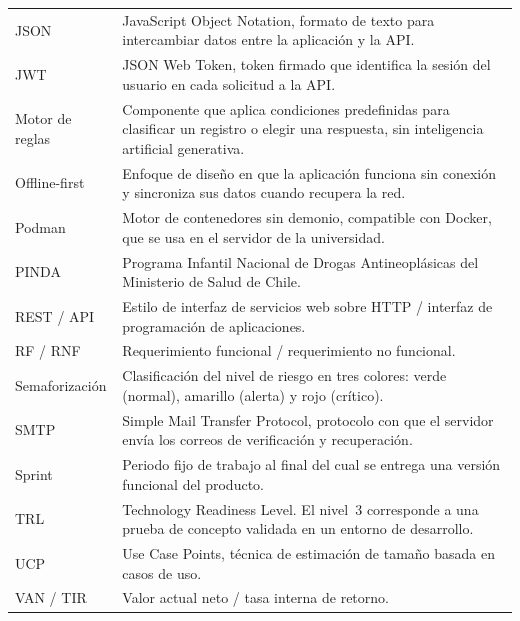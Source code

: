 \begin{xltabular}{\textwidth}{P{0.50}P{1.50}}
    JSON & JavaScript Object Notation, formato de texto para intercambiar datos
    entre la aplicación y la API. \\
    JWT & JSON Web Token, token firmado que identifica la sesión del usuario en
    cada solicitud a la API. \\
    Motor de reglas & Componente que aplica condiciones predefinidas para
    clasificar un registro o elegir una respuesta, sin inteligencia artificial
    generativa. \\
    Offline-first & Enfoque de diseño en que la aplicación funciona sin conexión
    y sincroniza sus datos cuando recupera la red. \\
    Podman & Motor de contenedores sin demonio, compatible con Docker, que se
    usa en el servidor de la universidad. \\
    PINDA & Programa Infantil Nacional de Drogas Antineoplásicas del Ministerio
    de Salud de Chile. \\
    REST / API & Estilo de interfaz de servicios web sobre HTTP / interfaz de
    programación de aplicaciones. \\
    RF / RNF & Requerimiento funcional / requerimiento no funcional. \\
    Semaforización & Clasificación del nivel de riesgo en tres colores: verde
    (normal), amarillo (alerta) y rojo (crítico). \\
    SMTP & Simple Mail Transfer Protocol, protocolo con que el servidor envía los
    correos de verificación y recuperación. \\
    Sprint & Periodo fijo de trabajo al final del cual se entrega una versión
    funcional del producto. \\
    TRL & Technology Readiness Level. El nivel~3 corresponde a una prueba de
    concepto validada en un entorno de desarrollo. \\
    UCP & Use Case Points, técnica de estimación de tamaño basada en casos de
    uso. \\
    VAN / TIR & Valor actual neto / tasa interna de retorno. \\
\end{xltabular}
\endgroup

